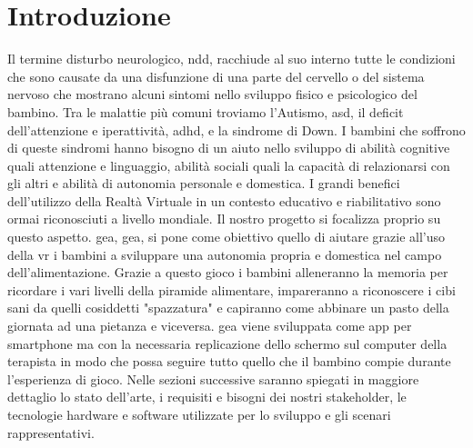\section{Introduzione} \label{sec:intro}

Il termine disturbo neurologico, \acs{ndd}, racchiude al suo interno tutte le condizioni che sono causate da una disfunzione di una parte del cervello o del sistema nervoso che mostrano alcuni sintomi nello sviluppo fisico e psicologico del bambino. Tra le malattie più comuni troviamo l'Autismo, \acs{asd}, il deficit dell'attenzione e iperattività, \acs{adhd}, e la sindrome di Down. I bambini che soffrono di queste sindromi hanno bisogno di un aiuto nello sviluppo di abilità cognitive quali attenzione e linguaggio, abilità sociali quali la capacità di relazionarsi con gli altri e abilità di autonomia personale e domestica. I grandi benefici dell'utilizzo della Realtà Virtuale in un contesto educativo e riabilitativo sono ormai riconosciuti a livello mondiale. Il nostro progetto si focalizza proprio su questo aspetto. \acs{gea}, \acl{gea}, si pone come obiettivo quello di aiutare grazie all'uso della \acs{vr} i bambini a sviluppare una autonomia propria e domestica nel campo dell'alimentazione. Grazie a questo gioco i bambini alleneranno la memoria per ricordare i vari livelli della piramide alimentare, impareranno a riconoscere i cibi sani da quelli cosiddetti "spazzatura" e capiranno come abbinare un pasto della giornata ad una pietanza e viceversa. \acs{gea} viene sviluppata come app per smartphone ma con la necessaria replicazione dello schermo sul computer della terapista in modo che possa seguire tutto quello che il bambino compie durante l'esperienza di gioco. Nelle sezioni successive saranno spiegati in maggiore dettaglio lo stato dell'arte, i requisiti e bisogni dei nostri stakeholder, le tecnologie hardware e software utilizzate per lo sviluppo e gli scenari rappresentativi.
